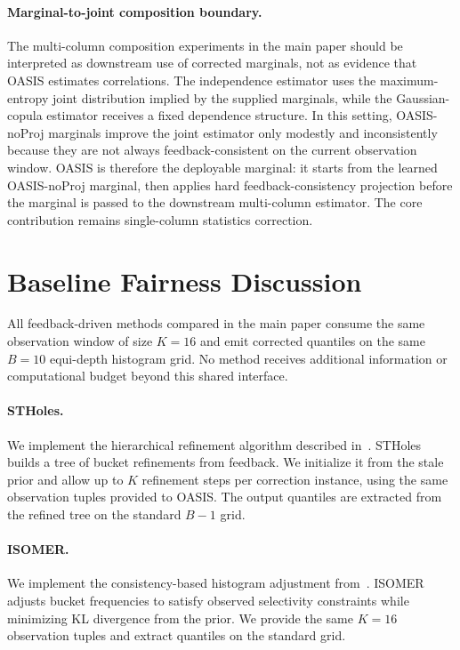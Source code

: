 \documentclass[11pt]{article}
\begin{document}
\paragraph{Marginal-to-joint composition boundary.}
The multi-column composition experiments in the main paper should be interpreted
as downstream use of corrected marginals, not as evidence that OASIS estimates
correlations. The independence estimator uses the maximum-entropy joint
distribution implied by the supplied marginals, while the Gaussian-copula
estimator receives a fixed dependence structure. In this setting, OASIS-noProj
marginals improve the joint estimator only modestly and inconsistently because
they are not always feedback-consistent on the current observation window.
OASIS is therefore the deployable marginal: it starts from the learned
OASIS-noProj marginal, then applies hard feedback-consistency projection before
the marginal is passed to the downstream multi-column estimator. The core
contribution remains single-column statistics correction.




\section{Baseline Fairness Discussion}
\label{sec:baseline-fairness}

All feedback-driven methods compared in the main paper consume the same
observation window of size $K{=}16$ and emit corrected quantiles on the same
$B{=}10$ equi-depth histogram grid. No method receives additional information
or computational budget beyond this shared interface.

\paragraph{STHoles.}
We implement the hierarchical refinement algorithm described
in~\cite{bruno2001stholes}. STHoles builds a tree of bucket refinements from
feedback. We initialize it from the stale prior and allow up to $K$ refinement
steps per correction instance, using the same observation tuples provided to
OASIS. The output quantiles are extracted from the refined tree on the standard
$B{-}1$ grid.

\paragraph{ISOMER.}
We implement the consistency-based histogram adjustment
from~\cite{markl2007consistent}. ISOMER adjusts bucket frequencies to satisfy
observed selectivity constraints while minimizing KL divergence from the prior.
We provide the same $K{=}16$ observation tuples and extract quantiles on the
standard grid.
\end{document}
